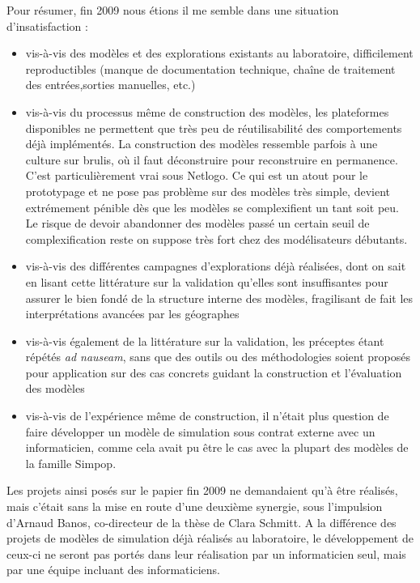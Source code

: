 Pour résumer, fin 2009 nous étions il me semble dans une situation d'insatisfaction :
\begin{itemize}[noitemsep,nolistsep]
\item  vis-à-vis des modèles et des explorations existants au laboratoire, difficilement reproductibles (manque de documentation technique, chaîne de traitement des entrées,sorties manuelles, etc.)

\item vis-à-vis du processus même de construction des modèles, les plateformes disponibles ne permettent que très peu de réutilisabilité des comportements déjà implémentés. La construction des modèles ressemble parfois à une culture sur brulis, où il faut déconstruire pour reconstruire en permanence.  C'est particulièrement vrai sous Netlogo. Ce qui est un atout pour le prototypage et ne pose pas problème sur des modèles très simple, devient extrémement pénible dès que les modèles se complexifient un tant soit peu. Le risque de devoir abandonner des modèles passé un certain seuil de complexification reste on suppose très fort chez des modélisateurs débutants.

\item vis-à-vis des différentes campagnes d'explorations déjà réalisées, dont on sait en lisant cette littérature sur la validation qu'elles sont insuffisantes pour assurer le bien fondé de la structure interne des modèles, fragilisant de fait les interprétations avancées par les géographes

\item vis-à-vis également de la littérature sur la validation, les préceptes étant répétés \textit{ad nauseam}, sans que des outils ou des méthodologies soient proposés pour application sur des cas concrets guidant la construction et l'évaluation des modèles

\item vis-à-vis de l'expérience même de construction, il n'était plus question de faire développer un modèle de simulation sous contrat externe avec un informaticien, comme cela avait pu être le cas avec la plupart des modèles de la famille Simpop. %

\end{itemize}

Les projets ainsi posés sur le papier fin 2009 ne demandaient qu'à être réalisés, mais c'était sans la mise en route d'une deuxième synergie, sous l'impulsion d'Arnaud Banos, co-directeur de la thèse de Clara Schmitt. A la différence des projets de modèles de simulation déjà réalisés au laboratoire, le développement de ceux-ci ne seront pas portés dans leur réalisation par un informaticien seul, mais par une équipe incluant des informaticiens.

